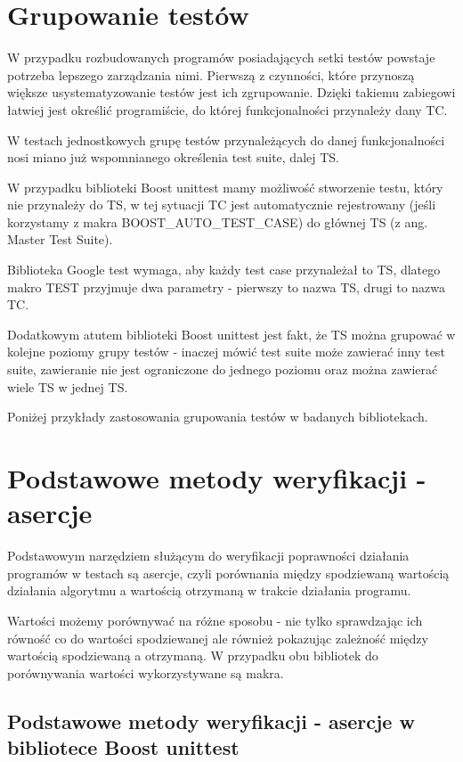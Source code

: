 \documentclass[12pt,a4paper,notitlepage]{report}
\begin{document}
\chapter{Grupowanie testów}

W przypadku rozbudowanych programów posiadających setki testów powstaje potrzeba lepszego zarządzania nimi. Pierwszą z czynności, które przynoszą większe usystematyzowanie testów jest ich zgrupowanie. Dzięki takiemu zabiegowi łatwiej jest określić programiście, do której funkcjonalności przynależy dany TC.

W testach jednostkowych grupę testów przynależących do danej funkcjonalności nosi miano już wspomnianego określenia test suite, dalej TS. 

W przypadku biblioteki Boost unittest mamy możliwość stworzenie testu, który nie przynależy do TS, w tej sytuacji TC jest automatycznie rejestrowany (jeśli korzystamy z makra BOOST{\_}AUTO{\_}TEST{\_}CASE) do głównej TS (z ang. Master Test Suite).

Biblioteka Google test wymaga, aby każdy test case przynależał to TS, dlatego makro TEST przyjmuje dwa parametry - pierwszy to nazwa TS, drugi to nazwa TC.

Dodatkowym atutem biblioteki Boost unittest jest fakt, że TS można grupować w kolejne poziomy grupy testów - inaczej mówić test suite może zawierać inny test suite, zawieranie nie jest ograniczone do jednego poziomu oraz można zawierać wiele TS w jednej TS.

Poniżej przykłady zastosowania grupowania testów w badanych bibliotekach.

\chapter{Podstawowe metody weryfikacji - asercje}

Podstawowym narzędziem służącym do weryfikacji poprawności działania programów w testach są asercje, czyli porównania między spodziewaną wartością działania algorytmu a wartością otrzymaną w trakcie działania programu.

Wartości możemy porównywać na różne sposobu - nie tylko sprawdzając ich równość co do wartości spodziewanej ale również pokazując zależność między wartością spodziewaną a otrzymaną. W przypadku obu bibliotek do porównywania wartości wykorzystywane są makra.

\section{Podstawowe metody weryfikacji - asercje w bibliotece Boost unittest}
\end{document}

